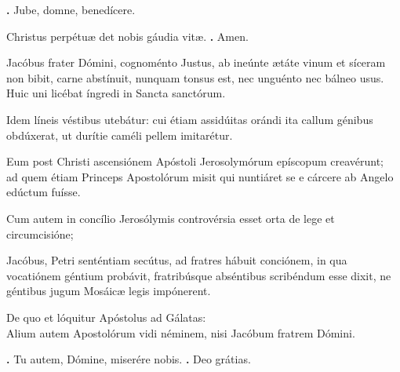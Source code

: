 \begin{small}
\textbf{\Vbar.} Jube, domne, benedícere.

Christus perpétuæ det nobis gáudia vitæ.
\textbf{\Rbar.} Amen.
\end{small}


Jacóbus frater Dómini, cognoménto Justus, ab ineúnte ætáte vinum et síceram non bibit, carne abstínuit, nunquam tonsus est, nec unguénto nec bálneo usus. 
Huic uni licébat íngredi in Sancta sanctórum. 

Idem líneis véstibus utebátur: cui étiam assidúitas orándi ita callum génibus obdúxerat, ut durítie caméli pellem imitarétur. 

Eum post Christi ascensiónem Apóstoli Jerosolymórum epíscopum creavérunt; \\
ad quem étiam Princeps Apostolórum misit qui nuntiáret se e cárcere ab Angelo edúctum fuísse. 

Cum autem in concílio Jerosólymis controvérsia esset orta de lege et circumcisióne; 

Jacóbus, Petri senténtiam secútus, ad fratres hábuit conciónem, in qua vocatiónem géntium probávit, fratribúsque abséntibus scribéndum esse dixit, ne géntibus jugum Mosáicæ legis impónerent. 

De quo et lóquitur Apóstolus ad Gálatas: \\
Alium autem Apostolórum vidi néminem, nisi Jacóbum fratrem Dómini.

\textbf{\Vbar.} Tu autem, Dómine, miserére nobis.
\textbf{\Rbar.} Deo grátias.

